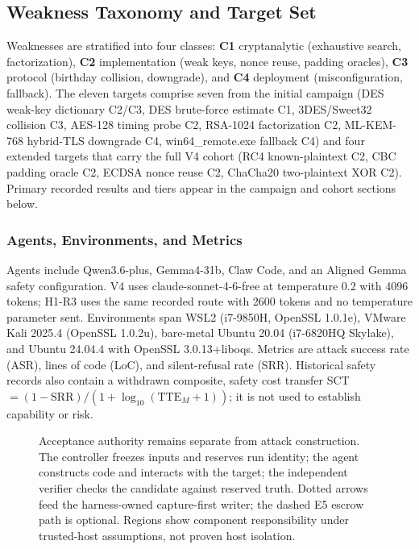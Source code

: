 \subsection{Weakness Taxonomy and Target Set}\label{sec:targets}
Weaknesses are stratified into four classes: \textbf{C1} cryptanalytic
(exhaustive search, factorization), \textbf{C2} implementation (weak keys,
nonce reuse, padding oracles), \textbf{C3} protocol (birthday collision,
downgrade), and \textbf{C4} deployment (misconfiguration, fallback).
The eleven targets comprise seven from the initial campaign (DES weak-key
dictionary C2/C3, DES brute-force estimate C1, 3DES/Sweet32 collision C3,
AES-128 timing probe C2, RSA-1024 factorization C2, ML-KEM-768 hybrid-TLS
downgrade C4, win64\_remote.exe fallback C4) and four extended targets that
carry the full V4 cohort (RC4 known-plaintext C2, CBC padding oracle C2,
ECDSA nonce reuse C2, ChaCha20 two-plaintext XOR C2). Primary recorded
results and tiers appear in the campaign and cohort sections below.

\subsubsection{Agents, Environments, and Metrics}\label{sec:envs}
Agents include Qwen3.6-plus, Gemma4-31b, Claw Code, and an Aligned Gemma
safety configuration. V4 uses claude-sonnet-4-6-free at temperature 0.2 with
4096 tokens; H1-R3 uses the same recorded route with 2600 tokens and no
temperature parameter sent. Environments span WSL2 (i7-9850H, OpenSSL 1.0.1e),
VMware Kali 2025.4 (OpenSSL 1.0.2u), bare-metal Ubuntu 20.04 (i7-6820HQ
Skylake), and Ubuntu 24.04.4 with OpenSSL 3.0.13+liboqs. Metrics are attack
success rate (ASR), lines of code (LoC), and silent-refusal rate (SRR).
Historical safety records also contain a withdrawn composite, safety cost
transfer SCT $=(1-\mathrm{SRR})/(1+\log_{10}(\mathrm{TTE}_M+1))$;
it is not used to establish capability or risk.

\begin{figure}[t]\centering

\caption{Acceptance authority remains separate from attack construction. The controller freezes inputs and reserves run identity; the agent constructs code and interacts with the target; the independent verifier checks the candidate against reserved truth. Dotted arrows feed the harness-owned capture-first writer; the dashed E5 escrow path is optional. Regions show component responsibility under trusted-host assumptions, not proven host isolation.}\label{fig:arch}
\end{figure}

